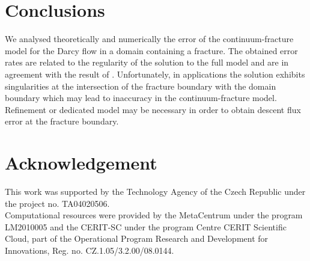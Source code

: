 \documentclass{llncs}
\renewcommand{\note}[2]{{\color{blue} \textbf{ #1:} \textit{#2}}}
\begin{document}
\section{Conclusions}

We analysed theoretically and numerically the error of the continuum-fracture model for the Darcy flow in a domain containing a fracture.
The obtained error rates are related to the regularity of the solution to the full model and are in agreement with the result of \cite{martin_modeling_2005}.
Unfortunately, in applications the solution exhibits singularities at the intersection of the fracture boundary with the domain boundary 
which may lead to inaccuracy in the continuum-fracture model. Refinement or dedicated model may be necessary in order to obtain descent 
flux error at the fracture boundary.







\section*{Acknowledgement}
This work was supported by the Technology Agency of the Czech Republic under the
project no. TA04020506.\\
Computational resources were provided by the MetaCentrum under the program LM2010005
and the CERIT-SC under the program Centre CERIT Scientific Cloud,
part of the Operational Program Research and Development for Innovations, Reg. no. CZ.1.05/3.2.00/08.0144.




\end{document}

